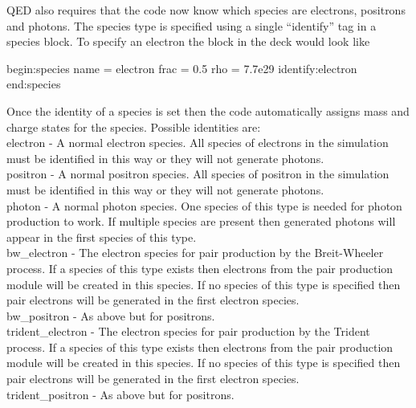 QED also requires that the code now know which species are electrons,
positrons and photons. The species type is specified using a single
``identify'' tag in a species block. To specify an electron the block in the
deck would look like

\begin{boxverbatim}
begin:species
   name = electron
   frac = 0.5
   rho = 7.7e29
   identify:electron
end:species
\end{boxverbatim}

Once the identity of a species is set then the code automatically assigns
mass and charge states for the species.
Possible identities are:\\

{\emphtext electron} - A normal electron species. All species of electrons in
  the simulation must be identified in this way or they will not generate
  photons.\\

{\emphtext positron} - A normal positron species. All species of positron in
  the simulation must be identified in this way or they will not generate
  photons.\\

{\emphtext photon} - A normal photon species. One species of this type is
  needed for photon production to work. If multiple species are present then
  generated photons will appear in the first species of this type.\\

{\emphtext bw\_electron} - The electron species for pair production by the
  Breit-Wheeler process. If a species of this type exists then electrons from
  the pair production module will be created in this species. If no species of
  this type is specified then pair electrons will be generated in the first
  electron species.\\

{\emphtext bw\_positron} - As above but for positrons.\\

{\emphtext trident\_electron} - The electron species for pair production by
  the Trident process. If a species of this type exists then electrons from
  the pair production module will be created in this species. If no species
  of this type is specified then pair electrons will be generated in the first
  electron species.\\

{\emphtext trident\_positron} - As above but for positrons.\\


